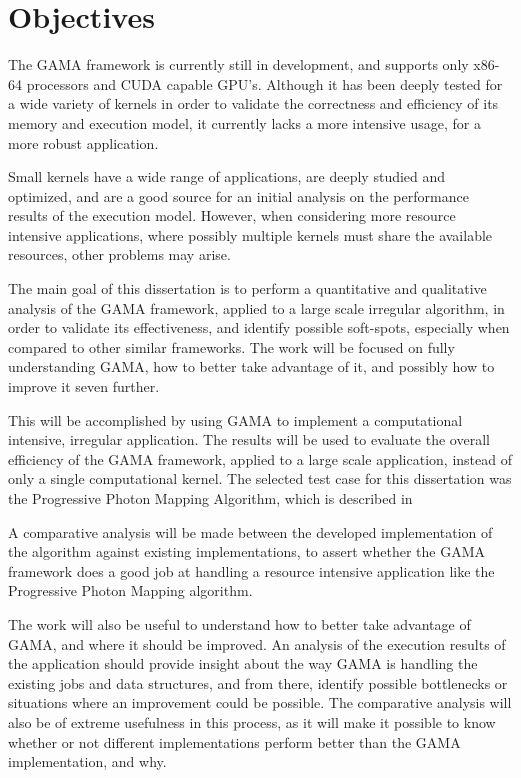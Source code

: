 \section{Objectives}

The GAMA framework is currently still in development, and supports only x86-64 processors and CUDA capable GPU's. Although it has been deeply tested for a wide variety of kernels in order to validate the correctness and efficiency of its memory and execution model, it currently lacks a more intensive usage, for a more robust application.

Small kernels have a wide range of applications, are deeply studied and optimized, and are a good source for an initial analysis on the performance results of the execution model. However, when considering more resource intensive applications, where possibly multiple kernels must share the available resources, other problems may arise.

The main goal of this dissertation is to perform a quantitative and qualitative analysis of the GAMA framework, applied to a large scale irregular algorithm, in order to validate its effectiveness, and identify possible soft-spots, especially when compared to other similar frameworks. The work will be focused on fully understanding GAMA, how to better take advantage of it, and possibly how to improve it seven further. 

This will be accomplished by using GAMA to implement a computational intensive, irregular application. The results will be used to evaluate the overall efficiency of the GAMA framework, applied to a large scale application, instead of only a single computational kernel. The selected test case for this dissertation was the Progressive Photon Mapping Algorithm, which is described in 

A comparative analysis will be made between the developed implementation of the algorithm against existing implementations, to assert whether the GAMA framework does a good job at handling a resource intensive application like the Progressive Photon Mapping algorithm.

The work will also be useful to understand how to better take advantage of GAMA, and where it should be improved. An analysis of the execution results of the application should provide insight about the way GAMA is handling the existing jobs and data structures, and from there, identify possible bottlenecks or situations where an improvement could be possible.
The comparative analysis will also be of extreme usefulness in this process, as it will make it possible to know whether or not different implementations perform better than the GAMA implementation, and why. 


